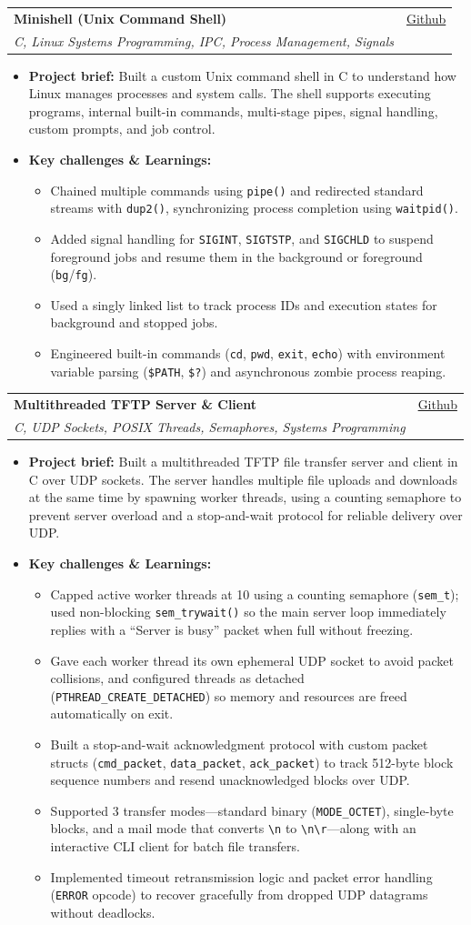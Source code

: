 \documentclass[letterpaper,11pt]{article}
\makeatletter
\newcommand{\resumeItem}[1]{
  \item
    {#1 \vspace{-3pt}}
}
\newcommand{\resumeSubheading}[4]{
  \vspace{-3pt}\item
    \begin{tabular*}{0.97\textwidth}[t]{l@{\extracolsep{\fill}}r}
      \textbf{#1} & #2 \\
      \textit{#3} & {#4} \\
    \end{tabular*}\vspace{-8pt}
}
\newcommand{\resumeItemListStart}{\begin{itemize}[topsep=1pt, itemsep=0.5pt, parsep=0pt]}
\newcommand{\resumeItemListEnd}{\end{itemize}\vspace{-6pt}}
\makeatother
\begin{document}
    \resumeSubheading
      {Minishell (Unix Command Shell)}{\href{https://github.com/k0-R0/Minishell}{Github}}
      {C, Linux Systems Programming, IPC, Process Management, Signals}{}
      \resumeItemListStart
        \resumeItem{\textbf{Project brief:} Built a custom Unix command shell in C to understand how Linux manages processes and system calls. The shell supports executing programs, internal built-in commands, multi-stage pipes, signal handling, custom prompts, and job control.}
        \resumeItem{\textbf{Key challenges \& Learnings:}}
        \resumeItemListStart
            \resumeItem{Chained multiple commands using \texttt{pipe()} and redirected standard streams with \texttt{dup2()}, synchronizing process completion using \texttt{waitpid()}.}
            \resumeItem{Added signal handling for \texttt{SIGINT}, \texttt{SIGTSTP}, and \texttt{SIGCHLD} to suspend foreground jobs and resume them in the background or foreground (\texttt{bg}/\texttt{fg}).}
            \resumeItem{Used a singly linked list to track process IDs and execution states for background and stopped jobs.}
            \resumeItem{Engineered built-in commands (\texttt{cd}, \texttt{pwd}, \texttt{exit}, \texttt{echo}) with environment variable parsing (\texttt{\$PATH}, \texttt{\$?}) and asynchronous zombie process reaping.}
        \resumeItemListEnd
      \resumeItemListEnd

    \resumeSubheading
      {Multithreaded TFTP Server \& Client}{\href{https://github.com/k0-R0/TFTP}{Github}}
      {C, UDP Sockets, POSIX Threads, Semaphores, Systems Programming}{}
      \resumeItemListStart
        \resumeItem{\textbf{Project brief:} Built a multithreaded TFTP file transfer server and client in C over UDP sockets. The server handles multiple file uploads and downloads at the same time by spawning worker threads, using a counting semaphore to prevent server overload and a stop-and-wait protocol for reliable delivery over UDP.}
        \resumeItem{\textbf{Key challenges \& Learnings:}}
        \resumeItemListStart
            \resumeItem{Capped active worker threads at 10 using a counting semaphore (\texttt{sem\_t}); used non-blocking \texttt{sem\_trywait()} so the main server loop immediately replies with a ``Server is busy'' packet when full without freezing.}
            \resumeItem{Gave each worker thread its own ephemeral UDP socket to avoid packet collisions, and configured threads as detached (\texttt{PTHREAD\_CREATE\_DETACHED}) so memory and resources are freed automatically on exit.}
            \resumeItem{Built a stop-and-wait acknowledgment protocol with custom packet structs (\texttt{cmd\_packet}, \texttt{data\_packet}, \texttt{ack\_packet}) to track 512-byte block sequence numbers and resend unacknowledged blocks over UDP.}
            \resumeItem{Supported 3 transfer modes---standard binary (\texttt{MODE\_OCTET}), single-byte blocks, and a mail mode that converts \texttt{\textbackslash n} to \texttt{\textbackslash n\textbackslash r}---along with an interactive CLI client for batch file transfers.}
            \resumeItem{Implemented timeout retransmission logic and packet error handling (\texttt{ERROR} opcode) to recover gracefully from dropped UDP datagrams without deadlocks.}
        \resumeItemListEnd
      \resumeItemListEnd
\end{document}
